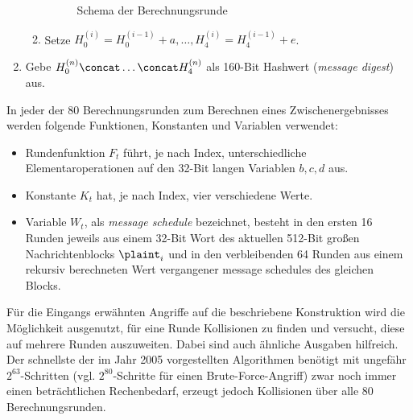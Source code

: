 \begin{enumerate}
\begin{enumerate}
\begin{figure}[h]
      \caption{Schema der Berechnungsrunde}
    \end{figure}
  \item Setze $H_0^{(i)} = H_0^{(i-1)} + a, \dots, H_4^{(i)} = H_4^{(i-1)} + e$.
  \end{enumerate}
\item Gebe $H_0^{(n)} \concat \dots \concat H_4^{(n)}$ als 160-Bit
  Hashwert (\emph{message digest}) aus. 
\end{enumerate} 

In jeder der 80 Berechnungsrunden zum Berechnen eines
Zwischenergebnisses werden folgende Funktionen, Konstanten und Variablen
verwendet: 
\begin{itemize}
\item Rundenfunktion $F_{t}$ führt, je nach Index, unterschiedliche
  Elementaroperationen auf den 32-Bit langen Variablen $b, c, d$ aus.
\item Konstante $K_{t}$ hat, je nach Index, vier verschiedene Werte.
\item Variable $W_{t}$, als \emph{message schedule} bezeichnet, besteht
  in den ersten 16 Runden jeweils aus einem 32-Bit Wort des aktuellen
  512-Bit großen Nachrichtenblocks $\plaint_{i}$ und in den
  verbleibenden 64 Runden aus einem rekursiv berechneten Wert
  vergangener message schedules des gleichen Blocks.
\end{itemize}

Für die Eingangs erwähnten Angriffe auf die beschriebene Konstruktion
wird die Möglichkeit ausgenutzt, für eine Runde Kollisionen zu finden
und versucht, diese auf mehrere Runden auszuweiten. Dabei sind auch
ähnliche Ausgaben hilfreich. Der schnellste der im Jahr 2005
vorgestellten Algorithmen benötigt mit ungefähr $2^{63}$-Schritten
(vgl. $2^{80}$-Schritte für einen Brute-Force-Angriff) zwar noch immer
einen beträchtlichen Rechenbedarf, erzeugt jedoch Kollisionen über alle
80 Berechnungsrunden.

